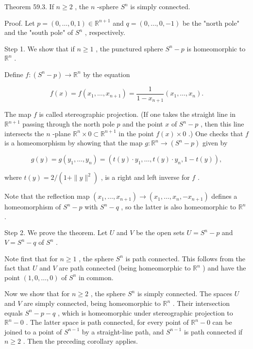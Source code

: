 \documentclass[10pt]{article}
\begin{document}
Theorem 59.3. If \(n \geq  2\) , the \(n\) -sphere \({S}^{n}\) is simply connected.

Proof. Let \(p = \left( {0,\ldots ,0,1}\right)  \in  {\mathbb{R}}^{n + 1}\) and \(q = \left( {0,\ldots ,0, - 1}\right)\) be the "north pole" and the "south pole" of \({S}^{n}\) , respectively.

Step 1. We show that if \(n \geq  1\) , the punctured sphere \({S}^{n} - p\) is homeomorphic to \({\mathbb{R}}^{n}\) .

Define \(f : \left( {{S}^{n} - p}\right)  \rightarrow  {\mathbb{R}}^{n}\) by the equation

\[
f\left( x\right)  = f\left( {{x}_{1},\ldots ,{x}_{n + 1}}\right)  = \frac{1}{1 - {x}_{n + 1}}\left( {{x}_{1},\ldots ,{x}_{n}}\right) .
\]

The map \(f\) is called stereographic projection. (If one takes the straight line in \({\mathbb{R}}^{n + 1}\) passing through the north pole \(p\) and the point \(x\) of \({S}^{n} - p\) , then this line intersects the \(n\) -plane \({\mathbb{R}}^{n} \times  0 \subset  {\mathbb{R}}^{n + 1}\) in the point \(f\left( x\right)  \times  0\) .) One checks that \(f\) is a homeomorphism by showing that the map \(g : {\mathbb{R}}^{n} \rightarrow  \left( {{S}^{n} - p}\right)\) given by

\[
g\left( y\right)  = g\left( {{y}_{1},\ldots ,{y}_{n}}\right)  = \left( {t\left( y\right)  \cdot  {y}_{1},\ldots ,t\left( y\right)  \cdot  {y}_{n},1 - t\left( y\right) }\right) ,
\]

where \(t\left( y\right)  = 2/\left( {1 + \parallel y{\parallel }^{2}}\right)\) , is a right and left inverse for \(f\) .

Note that the reflection map \(\left( {{x}_{1},\ldots ,{x}_{n + 1}}\right)  \rightarrow  \left( {{x}_{1},\ldots ,{x}_{n}, - {x}_{n + 1}}\right)\) defines a homeomorphism of \({S}^{n} - p\) with \({S}^{n} - q\) , so the latter is also homeomorphic to \({\mathbb{R}}^{n}\) .

Step 2. We prove the theorem. Let \(U\) and \(V\) be the open sets \(U = {S}^{n} - p\) and \(V = {S}^{n} - q\) of \({S}^{n}\) .

Note first that for \(n \geq  1\) , the sphere \({S}^{n}\) is path connected. This follows from the fact that \(U\) and \(V\) are path connected (being homeomorphic to \({\mathbb{R}}^{n}\) ) and have the point \(\left( {1,0,\ldots ,0}\right)\) of \({S}^{n}\) in common.

Now we show that for \(n \geq  2\) , the sphere \({S}^{n}\) is simply connected. The spaces \(U\) and \(V\) are simply connected, being homeomorphic to \({\mathbb{R}}^{n}\) . Their intersection equals \({S}^{n} - p - q\) , which is homeomorphic under stereographic projection to \({\mathbb{R}}^{n} - 0\) . The latter space is path connected, for every point of \({\mathbb{R}}^{n} - 0\) can be joined to a point of \({S}^{n - 1}\) by a straight-line path, and \({S}^{n - 1}\) is path connected if \(n \geq  2\) . Then the preceding corollary applies.
\end{document}
